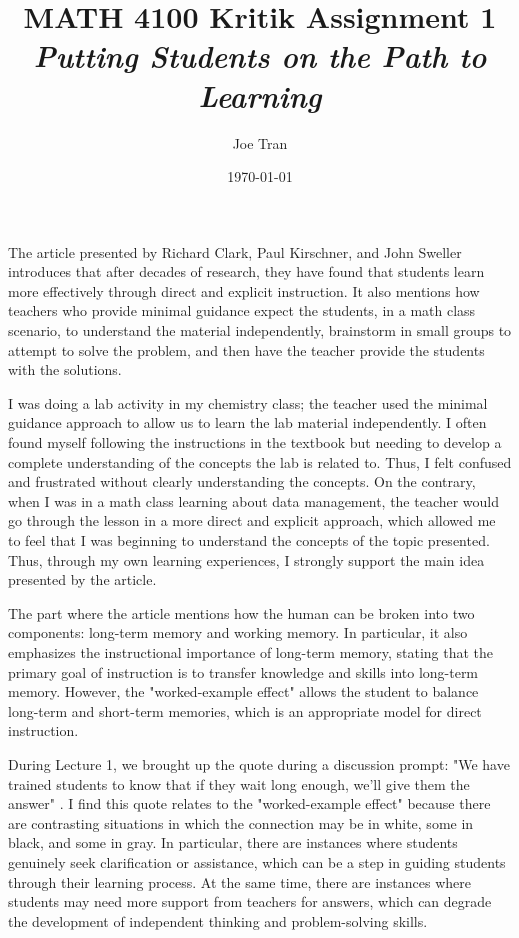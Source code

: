 \documentclass[11pt]{article}
\title{MATH 4100 Kritik Assignment 1 \\ \small \emph{Putting Students on the Path to Learning}}
\author{Joe Tran}
\date{\today}
\begin{document}
\maketitle

The article presented by Richard Clark, Paul Kirschner, and John Sweller introduces that after decades of research, they have found that students learn more effectively through direct and explicit instruction. It also mentions how teachers who provide minimal guidance expect the students, in a math class scenario, to understand the material independently, brainstorm in small groups to attempt to solve the problem, and then have the teacher provide the students with the solutions.

I was doing a lab activity in my chemistry class; the teacher used the minimal guidance approach to allow us to learn the lab material independently. I often found myself following the instructions in the textbook but needing to develop a complete understanding of the concepts the lab is related to. Thus, I felt confused and frustrated without clearly understanding the concepts. On the contrary, when I was in a math class learning about data management, the teacher would go through the lesson in a more direct and explicit approach, which allowed me to feel that I was beginning to understand the concepts of the topic presented. Thus, through my own learning experiences, I strongly support the main idea presented by the article.

The part where the article mentions how the human can be broken into two components: long-term memory and working memory. In particular, it also emphasizes the instructional importance of long-term memory, stating that the primary goal of instruction is to transfer knowledge and skills into long-term memory. However, the "worked-example effect" allows the student to balance long-term and short-term memories, which is an appropriate model for direct instruction.

During Lecture 1, we brought up the quote during a discussion prompt: "We have trained students to know that if they wait long enough, we'll give them the answer" \cite{lecture:1}. I find this quote relates to the "worked-example effect" because there are contrasting situations in which the connection may be in white, some in black, and some in gray. In particular, there are instances where students genuinely seek clarification or assistance, which can be a step in guiding students through their learning process. At the same time, there are instances where students may need more support from teachers for answers, which can degrade the development of independent thinking and problem-solving skills.
\end{document}
